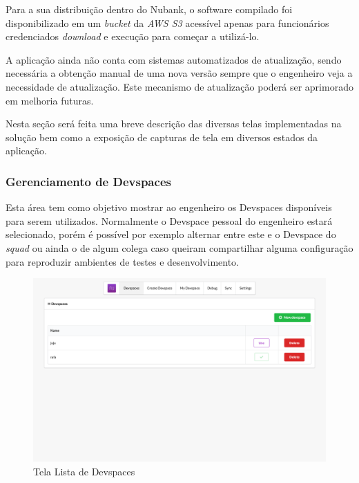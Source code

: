         Para a sua distribuição dentro do Nubank, o software compilado foi disponibilizado em um \textit{bucket} da \textit{AWS S3} acessível apenas para funcionários credenciados \textit{download} e execução para começar a utilizá-lo.
    
        A aplicação ainda não conta com sistemas automatizados de atualização, sendo necessária a obtenção manual de uma nova versão sempre que o engenheiro veja a necessidade de atualização. Este mecanismo de atualização poderá ser aprimorado em melhoria futuras.
        
        Nesta seção será feita uma breve descrição das diversas telas implementadas na solução bem como a exposição de capturas de tela em diversos estados da aplicação.
    
        \subsubsection{Gerenciamento de Devspaces}
        Esta área tem como objetivo mostrar ao engenheiro os Devspaces disponíveis para serem utilizados. Normalmente o Devspace pessoal do engenheiro estará selecionado, porém é possível por exemplo alternar entre este e o Devspace do \textit{squad} ou ainda o de algum colega caso queiram compartilhar alguma configuração para reproduzir ambientes de testes e desenvolvimento.
    
        \begin{figure}[htb]
        	\caption{\label{fig_frontend_devspaces}Tela Lista de Devspaces}
        	\begin{center}
        	\includegraphics[width=\textwidth,keepaspectratio]{pictures/frontend/frontend-devspaces.png}
        	\end{center}
        \end{figure}
    
